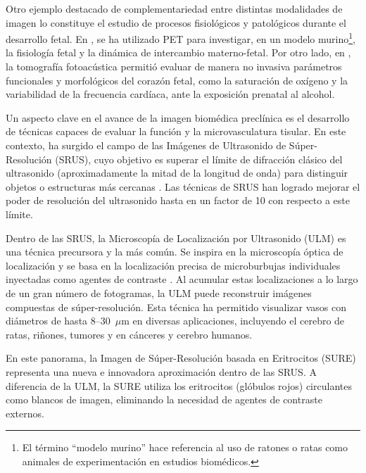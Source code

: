 \documentclass[10pt,a4paper]{article}
\begin{document}
Otro ejemplo destacado de complementariedad entre distintas modalidades de imagen lo constituye el estudio de procesos fisiológicos y patológicos durante el desarrollo fetal. En \cite{Torben2025}, se ha utilizado PET para investigar, en un modelo murino\footnote{El término “modelo murino” hace referencia al uso de ratones o ratas como animales de experimentación en estudios biomédicos.}, la fisiología fetal y la dinámica de intercambio materno-fetal. Por otro lado, en \cite{Tanvir2025}, la tomografía fotoacústica permitió evaluar de manera no invasiva parámetros funcionales y morfológicos del corazón fetal, como la saturación de oxígeno y la variabilidad de la frecuencia cardíaca, ante la exposición prenatal al alcohol.

Un aspecto clave en el avance de la imagen biomédica preclínica es el desarrollo de técnicas capaces de evaluar la función y la microvasculatura tisular. En este contexto, ha surgido el campo de las Imágenes de Ultrasonido de Súper-Resolución (SRUS), cuyo objetivo es superar el límite de difracción clásico del ultrasonido (aproximadamente la mitad de la longitud de onda) para distinguir objetos o estructuras más cercanas \cite{Christensen2020, Couture2018}. Las técnicas de SRUS han logrado mejorar el poder de resolución del ultrasonido hasta en un factor de 10 con respecto a este límite.

Dentro de las SRUS, la Microscopía de Localización por Ultrasonido (ULM) es una técnica precursora y la más común. Se inspira en la microscopía óptica de localización y se basa en la localización precisa de microburbujas individuales inyectadas como agentes de contraste \cite{Couture2018}. Al acumular estas localizaciones a lo largo de un gran número de fotogramas, la ULM puede reconstruir imágenes compuestas de súper-resolución. Esta técnica ha permitido visualizar vasos con diámetros de hasta 8--30~$\mu$m en diversas aplicaciones, incluyendo el cerebro de ratas, riñones, tumores y en cánceres y cerebro humanos. 

En este panorama, la Imagen de Súper-Resolución basada en Eritrocitos (SURE) \cite{Jensen2024_SURE} representa una nueva e innovadora aproximación dentro de las SRUS. A diferencia de la ULM, la SURE utiliza los eritrocitos (glóbulos rojos) circulantes como blancos de imagen, eliminando la necesidad de agentes de contraste externos. 
\end{document}

